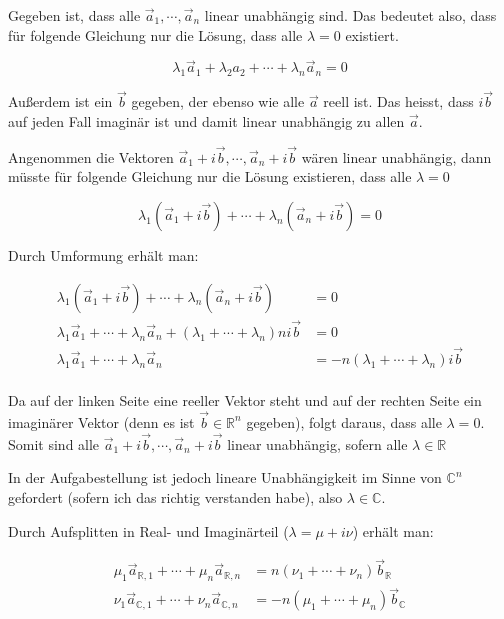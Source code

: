 \documentclass[a4paper,german,12pt,smallheadings]{scrartcl}
\begin{document}
Gegeben ist, dass alle $\vec{a}_1, \dotsb, \vec{a}_n$ linear unabhängig sind.
Das bedeutet also, dass für folgende Gleichung nur die Lösung, dass alle $\lambda =
0$ existiert.

\begin{equation*}
  \lambda_1\vec{a}_1 + \lambda_2{a}_2 + \dotsb + \lambda_n\vec{a}_n = 0
\end{equation*}

Außerdem ist ein $\vec{b}$ gegeben, der ebenso wie alle $\vec{a}$ reell ist.
Das heisst, dass $i \vec{b}$ auf jeden Fall imaginär ist und damit linear
unabhängig zu allen $\vec{a}$.

Angenommen die Vektoren $\vec{a}_1 + i\vec{b}, \dotsb, \vec{a}_n + i\vec{b}$
wären linear unabhängig, dann müsste für folgende Gleichung nur die Lösung
existieren, dass alle $\lambda = 0$

\begin{equation*}
\lambda_1(\vec{a}_1 + i\vec{b}) + \dotsb + \lambda_n(\vec{a}_n + i\vec{b}) = 0
\end{equation*}

Durch Umformung erhält man:

\begin{align*}
  \lambda_1(\vec{a}_1 + i\vec{b}) + \dotsb + \lambda_n(\vec{a}_n + i\vec{b}) &= 0 \\
  \lambda_1\vec{a}_1 + \dotsb + \lambda_n\vec{a}_n + (\lambda_1 + \dotsb + \lambda_n) ni\vec{b} &= 0 \\
  \lambda_1\vec{a}_1 + \dotsb + \lambda_n\vec{a}_n &= -n(\lambda_1 + \dotsb + \lambda_n)i\vec{b}  \\
\end{align*}

Da auf der linken Seite eine reeller Vektor steht und auf der rechten Seite ein
imaginärer Vektor (denn es ist $\vec{b} \in \mathbb{R}^n$ gegeben), folgt daraus, dass
alle $\lambda = 0$. Somit sind alle $\vec{a}_1 + i\vec{b}, \dotsb, \vec{a}_n + i\vec{b}$
linear unabhängig, sofern alle $\lambda \in \mathbb{R}$ 

In der Aufgabestellung ist jedoch lineare Unabhängigkeit im Sinne von $\mathbb{C}^n$
gefordert (sofern ich das richtig verstanden habe), also $\lambda \in \mathbb{C}$.

Durch Aufsplitten in Real- und Imaginärteil ($\lambda = \mu + i\nu$) erhält man:

\begin{align*}
  \mu_1\vec{a}_{\mathbb{R},1} + \dotsb + \mu_n\vec{a}_{\mathbb{R},n} &= n(\nu_1 + \dotsb + \nu_n)\vec{b}_{\mathbb{R}}  \\
  \nu_1\vec{a}_{\mathbb{C},1} + \dotsb + \nu_n\vec{a}_{\mathbb{C},n} &= -n(\mu_1 + \dotsb + \mu_n)\vec{b}_{\mathbb{C}}
\end{align*}
\end{document}
